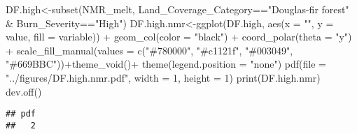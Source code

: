 \documentclass[
]{article}
\newenvironment{Shaded}{\begin{snugshade}}{\end{snugshade}}
\newcommand{\AttributeTok}[1]{\textcolor[rgb]{0.77,0.63,0.00}{#1}}
\newcommand{\DecValTok}[1]{\textcolor[rgb]{0.00,0.00,0.81}{#1}}
\newcommand{\FunctionTok}[1]{\textcolor[rgb]{0.00,0.00,0.00}{#1}}
\newcommand{\NormalTok}[1]{#1}
\newcommand{\OtherTok}[1]{\textcolor[rgb]{0.56,0.35,0.01}{#1}}
\newcommand{\SpecialCharTok}[1]{\textcolor[rgb]{0.00,0.00,0.00}{#1}}
\newcommand{\StringTok}[1]{\textcolor[rgb]{0.31,0.60,0.02}{#1}}
\begin{document}
\begin{Shaded}
\begin{Highlighting}[]
\NormalTok{DF.high}\OtherTok{\textless{}{-}}\FunctionTok{subset}\NormalTok{(NMR\_melt, Land\_Coverage\_Category}\SpecialCharTok{==}\StringTok{"Douglas{-}fir forest"} \SpecialCharTok{\&}\NormalTok{ Burn\_Severity}\SpecialCharTok{==}\StringTok{"High"}\NormalTok{)}
\NormalTok{DF.high.nmr}\OtherTok{\textless{}{-}}\FunctionTok{ggplot}\NormalTok{(DF.high, }\FunctionTok{aes}\NormalTok{(}\AttributeTok{x =} \StringTok{""}\NormalTok{, }\AttributeTok{y =}\NormalTok{ value, }\AttributeTok{fill =}\NormalTok{ variable)) }\SpecialCharTok{+}
    \FunctionTok{geom\_col}\NormalTok{(}\AttributeTok{color =} \StringTok{"black"}\NormalTok{) }\SpecialCharTok{+}
    \FunctionTok{coord\_polar}\NormalTok{(}\AttributeTok{theta =} \StringTok{"y"}\NormalTok{) }\SpecialCharTok{+} \FunctionTok{scale\_fill\_manual}\NormalTok{(}\AttributeTok{values =} \FunctionTok{c}\NormalTok{(}\StringTok{"\#780000"}\NormalTok{, }\StringTok{"\#c1121f"}\NormalTok{, }\StringTok{"\#003049"}\NormalTok{, }\StringTok{"\#669BBC"}\NormalTok{))}\SpecialCharTok{+}\FunctionTok{theme\_void}\NormalTok{()}\SpecialCharTok{+}
    \FunctionTok{theme}\NormalTok{(}\AttributeTok{legend.position =} \StringTok{"none"}\NormalTok{)}
\FunctionTok{pdf}\NormalTok{(}\AttributeTok{file =} \StringTok{"../figures/DF.high.nmr.pdf"}\NormalTok{, }\AttributeTok{width =} \DecValTok{1}\NormalTok{, }\AttributeTok{height =} \DecValTok{1}\NormalTok{) }
\FunctionTok{print}\NormalTok{(DF.high.nmr)}
\FunctionTok{dev.off}\NormalTok{()}
\end{Highlighting}
\end{Shaded}

\begin{verbatim}
## pdf 
##   2
\end{verbatim}
\end{document}
